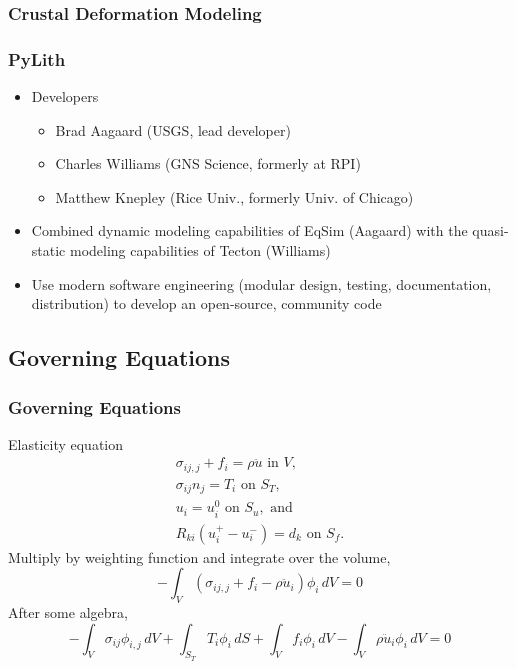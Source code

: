\documentclass{beamer}
\begin{document}
\begin{frame}
  \frametitle{Crustal Deformation Modeling}

  
  
\end{frame}


\begin{frame}
  \frametitle{PyLith}
  \summary{}

  \begin{itemize}
  \item Developers
    \begin{itemize}
    \item Brad Aagaard (USGS, lead developer)
    \item Charles Williams (GNS Science, formerly at RPI)
    \item Matthew Knepley (Rice Univ., formerly Univ. of Chicago)
    \end{itemize}
  \item Combined dynamic modeling capabilities of EqSim (Aagaard) with
    the quasi-static modeling capabilities of Tecton (Williams)
  \item Use modern software engineering (modular design, testing,
    documentation, distribution) to develop an open-source, community code
  \end{itemize}

\end{frame}


\subsection{Governing Equations}

\begin{frame}
  \frametitle{Governing Equations}
  \summary{}

  \vfill
  Elasticity equation
  \begin{gather}
    \sigma_{ij,j} + f_i = \rho \ddot{u} \text{ in } V, \\
    \sigma_{ij} n_j = T_i \text{ on } S_T, \\
    u_i = u_i^0 \text{ on } S_u, \text{ and } \\
    R_{ki}(u^{+}_i - u^{-}_i) = d_k \text{ on } S_f.
  \end{gather}
  Multiply by weighting function and integrate over the volume,
  \begin{equation}
    -\int_V (\sigma_{ij,j} + f_i - \rho \ddot{u}_i) \phi_i \, dV = 0
  \end{equation}
  After some algebra,
  \begin{equation}
    -\int_V \sigma_{ij} \phi_{i,j} \, dV 
    + \int_{S_T} T_i \phi_i\, dS
    + \int_V f_i \phi_i \, dV 
    - \int_V \rho \ddot{u}_i \phi_i \, dV = 0
  \end{equation}
  \vfill
  
\end{frame}
\end{document}
